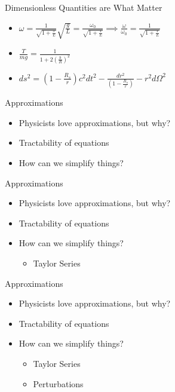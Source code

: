 \documentclass[10pt,xcolor={table,dvipsnames},t]{beamer}
\begin{document}
\begin{frame}{Dimensionless Quantities are What Matter}
    \begin{itemize}
        \item $\omega = \frac{1}{\sqrt{1 + \frac{x}{L}}} \sqrt{\frac{g}{L}} = \frac{\omega_0}{\sqrt{1 + \frac{x}{L}}} \implies \frac{\omega}{\omega_0} = \frac{1}{\sqrt{1 + \frac{x}{L}}} $
        \item $\frac{T}{mg} = \frac{1}{1 + 2\left(\frac{b}{R}\right)^2}$
        \item $ds^2 = \left(1 - \frac{R_s}{ r}\right)c^2dt^2 - \frac{dr^2}{\left(1 - \frac{R_s}{ r}\right)} - r^2 d\Omega^2$
    \end{itemize}
\end{frame}

\begin{frame}{Approximations}
    \begin{itemize}
        \item Physicists love approximations, but why?
        \item Tractability of equations
        \item How can we simplify things?
    \end{itemize}
\end{frame}

\begin{frame}{Approximations}
    \begin{itemize}
        \item Physicists love approximations, but why?
        \item Tractability of equations
        \item How can we simplify things?
        \begin{itemize}
            \item Taylor Series
        \end{itemize}
    \end{itemize}
\end{frame}

\begin{frame}{Approximations}
    \begin{itemize}
        \item Physicists love approximations, but why?
        \item Tractability of equations
        \item How can we simplify things?
        \begin{itemize}
            \item Taylor Series
            \item Perturbations
        \end{itemize}
    \end{itemize}
\end{frame}
\end{document}
